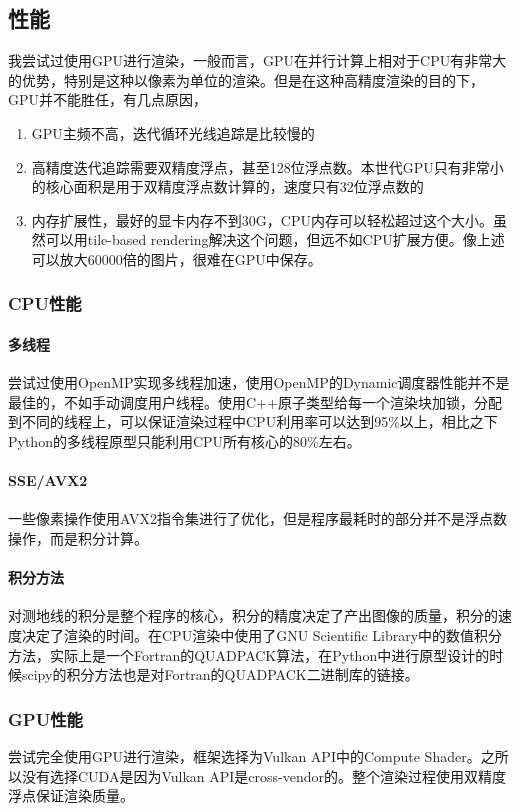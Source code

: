 \subsection{性能}
我尝试过使用GPU进行渲染，一般而言，GPU在并行计算上相对于CPU有非常大的优势，特别是这种以像素为单位的渲染。但是在这种高精度渲染的目的下，GPU并不能胜任，有几点原因，
\begin{enumerate}
    \item GPU主频不高，迭代循环光线追踪是比较慢的
    \item 高精度迭代追踪需要双精度浮点，甚至128位浮点数。本世代GPU只有非常小的核心面积是用于双精度浮点数计算的，速度只有32位浮点数的
    \item 内存扩展性，最好的显卡内存不到30G，CPU内存可以轻松超过这个大小。虽然可以用tile-based rendering解决这个问题，但远不如CPU扩展方便。像上述可以放大60000倍的图片，很难在GPU中保存。
\end{enumerate}

\subsubsection{CPU性能}
\paragraph{多线程}
尝试过使用OpenMP实现多线程加速，使用OpenMP的Dynamic调度器性能并不是最佳的，不如手动调度用户线程。使用C++原子类型给每一个渲染块加锁，分配到不同的线程上，可以保证渲染过程中CPU利用率可以达到95\%以上，相比之下Python的多线程原型只能利用CPU所有核心的80\%左右。

\paragraph{SSE/AVX2}
一些像素操作使用AVX2指令集进行了优化，但是程序最耗时的部分并不是浮点数操作，而是积分计算。

\paragraph{积分方法}
对测地线的积分是整个程序的核心，积分的精度决定了产出图像的质量，积分的速度决定了渲染的时间。在CPU渲染中使用了GNU Scientific Library中的数值积分方法，实际上是一个Fortran的QUADPACK算法，在Python中进行原型设计的时候scipy的积分方法也是对Fortran的QUADPACK二进制库的链接。

\subsubsection{GPU性能}
尝试完全使用GPU进行渲染，框架选择为Vulkan API中的Compute Shader。之所以没有选择CUDA是因为Vulkan API是cross-vendor的。整个渲染过程使用双精度浮点保证渲染质量。

